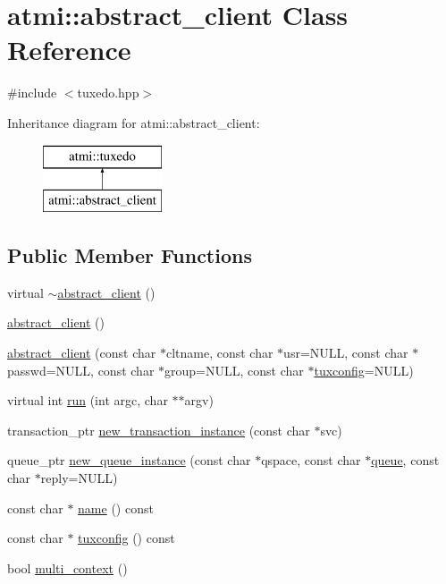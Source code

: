 \hypertarget{classatmi_1_1abstract__client}{\section{atmi\+:\+:abstract\+\_\+client Class Reference}
\label{classatmi_1_1abstract__client}
}


{\ttfamily \#include $<$tuxedo.\+hpp$>$}

Inheritance diagram for atmi\+:\+:abstract\+\_\+client\+:\begin{figure}[H]
\begin{center}
\leavevmode
\includegraphics[height=2.000000cm]{classatmi_1_1abstract__client}
\end{center}
\end{figure}
\subsection*{Public Member Functions}
\begin{DoxyCompactItemize}
\item 
virtual \hyperlink{classatmi_1_1abstract__client_a789a662f195c11cd9d9b6d091caa0874}{$\sim$abstract\+\_\+client} ()
\item 
\hyperlink{classatmi_1_1abstract__client_a10a6aa2b44cb98ceab7d4e637757437e}{abstract\+\_\+client} ()
\item 
\hyperlink{classatmi_1_1abstract__client_a67d65b7ec70b83b7fc55260256ac4fd0}{abstract\+\_\+client} (const char $\ast$cltname, const char $\ast$usr=N\+U\+L\+L, const char $\ast$passwd=N\+U\+L\+L, const char $\ast$group=N\+U\+L\+L, const char $\ast$\hyperlink{classatmi_1_1abstract__client_af2a6efcd7a45c09251cb129d04d7aa85}{tuxconfig}=N\+U\+L\+L)
\item 
virtual int \hyperlink{classatmi_1_1abstract__client_a090bac30edb1055da2a0c980167bfe19}{run} (int argc, char $\ast$$\ast$argv)
\item 
transaction\+\_\+ptr \hyperlink{classatmi_1_1abstract__client_a9449f2df2136afd5b253389418265c87}{new\+\_\+transaction\+\_\+instance} (const char $\ast$svc)
\item 
queue\+\_\+ptr \hyperlink{classatmi_1_1abstract__client_a7337c966369376497d9c1f94ec12c5ae}{new\+\_\+queue\+\_\+instance} (const char $\ast$qspace, const char $\ast$\hyperlink{classatmi_1_1queue}{queue}, const char $\ast$reply=N\+U\+L\+L)
\item 
const char $\ast$ \hyperlink{classatmi_1_1abstract__client_a2f50ed746c5bab5e01ef0677296e10e3}{name} () const 
\item 
const char $\ast$ \hyperlink{classatmi_1_1abstract__client_af2a6efcd7a45c09251cb129d04d7aa85}{tuxconfig} () const 
\item 
bool \hyperlink{classatmi_1_1abstract__client_a026c8cff81a66afdcfa3bf977417738a}{multi\+\_\+context} ()
\end{DoxyCompactItemize}
